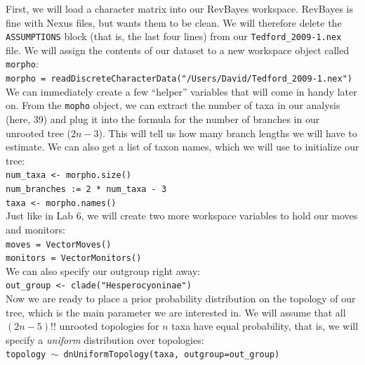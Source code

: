 \documentclass[12pt]{article}
\begin{document}
\noindent First, we will load a character matrix into our RevBayes workspace. RevBayes is fine with Nexus files, but wants them to be clean. We will therefore delete the \texttt{ASSUMPTIONS} block (that is, the last four lines) from our \texttt{Tedford\_2009-1.nex} file. We will assign the contents of our dataset to a new workspace object called \texttt{morpho}: \\

\indent \texttt{morpho = readDiscreteCharacterData("/Users/David/Tedford\_2009-1.nex")} \\

\noindent We can immediately create a few ``helper'' variables that will come in handy later on. From the \texttt{mopho} object, we can extract the number of taxa in our analysis (here, 39) and plug it into the formula for the number of branches in our unrooted tree ($2n - 3$). This will tell us how many branch lengths we will have to estimate. We can also get a list of taxon names, which we will use to initialize our tree: \\

\indent \texttt{num\_taxa <- morpho.size() } \\
\indent \texttt{num\_branches := 2 * num\_taxa - 3} \\
\indent \texttt{taxa <- morpho.names()} \\

\noindent Just like in Lab 6, we will create two more workspace variables to hold our moves and monitors: \\

\indent \texttt{moves = VectorMoves()} \\
\indent \texttt{monitors = VectorMonitors()} \\

\noindent We can also specify our outgroup right away: \\

\indent \texttt{out\_group <- clade("Hesperocyoninae")} \\

\noindent Now we are ready to place a prior probability distribution on the topology of our tree, which is the main parameter we are interested in. We will assume that all $(2n - 5)!!$ unrooted topologies for $n$ taxa have equal probability, that is, we will specify a \textit{uniform} distribution over topologies: \\

\indent \texttt{topology {\footnotesize $\sim$} dnUniformTopology(taxa, outgroup=out\_group)} \\
\end{document}
